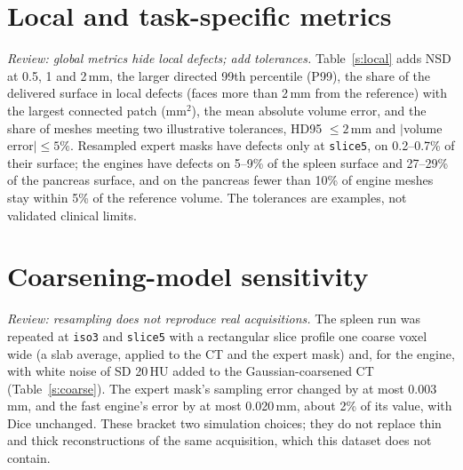 \documentclass[conference]{IEEEtran}
\newcommand{\lvl}[1]{\texttt{#1}}
\newcommand{\mm}{\,mm\xspace}
\begin{document}
\begin{table}[!t]
\caption{Production ASSD (mm) with blur in voxels and in millimetres, paired by scan; closed: \% of closed meshes, voxel / mm.}
\label{s:blur}
\centering\footnotesize

\end{table}

\section{Local and task-specific metrics}
\emph{Review: global metrics hide local defects; add tolerances.} Table~\ref{s:local} adds NSD at 0.5, 1 and 2\mm, the larger directed 99th percentile (P99), the share of the delivered surface in local defects (faces more than 2\mm from the reference) with the largest connected patch (mm$^2$), the mean absolute volume error, and the share of meshes meeting two illustrative tolerances, HD95 $\leq2$\mm and $|$volume error$|\leq5\%$. Resampled expert masks have defects only at \lvl{slice5}, on 0.2--0.7\% of their surface; the engines have defects on 5--9\% of the spleen surface and 27--29\% of the pancreas surface, and on the pancreas fewer than 10\% of engine meshes stay within 5\% of the reference volume. The tolerances are examples, not validated clinical limits.

\begin{table}[!t]
\caption{Local and task-specific metrics (means over scans; P99 in mm; HD95 $\leq$ 2 and $|$Vol$|\leq$ 5\%: \% of meshes meeting the tolerance). Cfg: canonical or production.}
\label{s:local}
\centering\scriptsize
\setlength{\tabcolsep}{3pt}

\end{table}

\section{Coarsening-model sensitivity}
\emph{Review: resampling does not reproduce real acquisitions.} The spleen run was repeated at \lvl{iso3} and \lvl{slice5} with a rectangular slice profile one coarse voxel wide (a slab average, applied to the CT and the expert mask) and, for the engine, with white noise of SD 20\,HU added to the Gaussian-coarsened CT (Table~\ref{s:coarse}). The expert mask's sampling error changed by at most 0.003\mm, and the fast engine's error by at most 0.020\mm, about 2\% of its value, with Dice unchanged. These bracket two simulation choices; they do not replace thin and thick reconstructions of the same acquisition, which this dataset does not contain.
\end{document}
